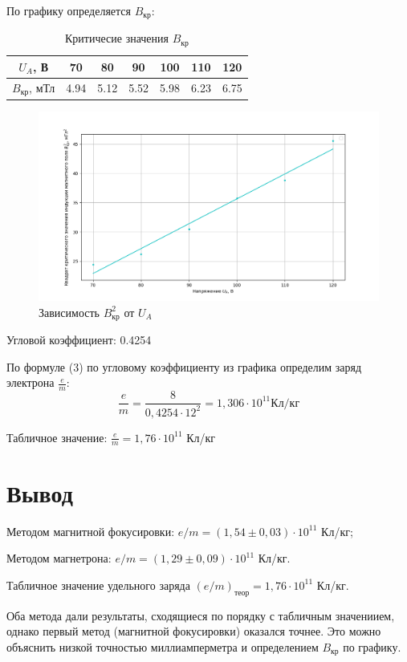 \documentclass{article}
\begin{document}
По графику определяется $B_\text{кр}$:

\begin{table}[h]
    \centering
    \begin{tabular}{|c|c|c|c|c|c|c|}
    \hline
        $U_A$, В & 70 & 80 & 90 & 100 & 110 & 120 \\
    \hline
        $B_\text{кр}$, мТл & 4.94 & 5.12 & 5.52 & 5.98 & 6.23 & 6.75 \\
    \hline
    \end{tabular}
    \caption{Критичесие значения $B_\text{кр}$}
\end{table}

\begin{figure}[h]
    \centering
    \includegraphics[width=0.5\linewidth]{Figure_1.png}
    \caption{Зависимость $B^2_\text{кр}$ от $U_A$}
    \label{fig:placeholder}
\end{figure}

Угловой коэффициент: 0.4254

По формуле (3) по угловому коэффициенту из графика определим заряд электрона $\frac{e}{m}$:
$$\frac{e}{m} = \frac{8}{0,4254 \cdot 12^2} = 1,306 \cdot 10^{11} \text{Кл/кг}$$

Табличное значение: $\frac{e}{m} = 1,76 \cdot 10^{11}$ Кл/кг

\newpage

\section*{Вывод}
Методом магнитной фокусировки: $e/m = (1,54 \pm 0,03)\cdot 10^{11}$ Кл/кг;

Методом магнетрона: $e/m = (1,29 \pm 0,09)\cdot 10^{11}$ Кл/кг.

Табличное значение удельного заряда $(e/m)_\text{теор} = 1,76\cdot 10^{11}$ Кл/кг. 

Оба метода дали результаты, сходящиеся по порядку с табличным значениием, однако первый метод (магнитной фокусировки) оказался точнее. Это можно объяснить низкой точностью миллиамперметра и определением $B_\text{кр}$ по графику.
\end{document}
